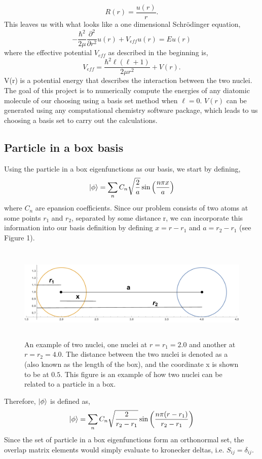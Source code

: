 \documentclass[12pt]{article}
\newcommand{\be}{\begin{equation}}
\newcommand{\ee}{\end{equation}}
\begin{document}
\be
    R(r) = \frac{u(r)}{r} .
\ee
This leaves us with what looks like a one dimensional Schr\"odinger equation,
\be
    -\frac{\hbar^2}{2\mu} \frac{\partial^2}{\partial r^2} u(r) + V_{eff} u(r) = E u(r)
\ee
where the effective potential $V_{eff}$ as described in the beginning is,
\be
    V_{eff} = \frac{\hbar^2 \ell(\ell+1)}{2\mu r^2} + V(r) .
\ee
V(r) is a potential energy that describes the interaction between the two nuclei. The goal of this project is to numerically compute the energies of any diatomic molecule of our choosing using a basis set method when $\ell = 0$. $V(r)$ can be generated using any computational chemistry software package, which leads to us choosing a basis set to carry out the calculations.

\subsection{Particle in a box basis}
Using the particle in a box eigenfunctions as our basis, we start by defining,
\be
    \ket{\phi} = \sum_n C_n \sqrt{ \frac{2}{a}} \sin \left(\frac{n \pi x}{a} \right)
\ee
where $C_n$ are epansion coefficients.\cite{zhang}
Since our problem consists of two atoms at some points $r_1$ and $r_2$, separated by some distance r, we can incorporate this information into our basis definition by defining $x = r - r_1$ and $a = r_2 - r_1$ (see Figure 1).
\begin{figure}[H]
    \centering
    \includegraphics[height=1.8in]{figures/graphic.pdf}
    \caption{An example of two nuclei, one nuclei at $r = r_1 = 2.0$ and another at $r = r_2 = 4.0$. The distance between the two nuclei is denoted as a (also known as the length of the box), and the coordinate x is shown to be at $0.5$. This figure is an example of how two nuclei can be related to a particle in a box.}
\end{figure}
Therefore, $\ket{\phi}$ is defined as,
\be
    \ket{\phi} = \sum_n C_n \sqrt{ \frac{2}{r_2-r_1}} \sin \left(\frac{n \pi (r - r_1)}{r_2 - r_1} \right)
\ee
Since the set of particle in a box eigenfunctions form an orthonormal set, the overlap matrix elements would simply evaluate to kronecker deltas, i.e. $S_{ij} = \delta_{ij}$.
\end{document}
